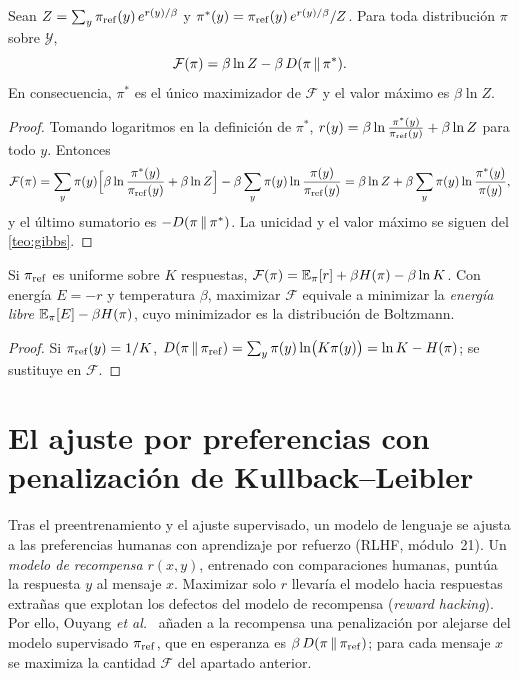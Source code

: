 \begin{teorema}\label{teo:variacional}
Sean $Z=\sum_y\pi_{\mathrm{ref}}(y)\,e^{r(y)/\beta}$ y $\pi^{*}(y)=\pi_{\mathrm{ref}}(y)\,e^{r(y)/\beta}/Z$. Para toda distribución $\pi$ sobre $\mathcal{Y}$,
\[
\mathcal{F}(\pi)=\beta\ln Z-\beta\,D(\pi\,\|\,\pi^{*}).
\]
En consecuencia, $\pi^{*}$ es el único maximizador de $\mathcal{F}$ y el valor máximo es $\beta\ln Z$.
\end{teorema}

\begin{proof}
Tomando logaritmos en la definición de $\pi^{*}$, $r(y)=\beta\ln\frac{\pi^{*}(y)}{\pi_{\mathrm{ref}}(y)}+\beta\ln Z$ para todo $y$. Entonces
\[
\mathcal{F}(\pi)=\sum_y\pi(y)\Bigl[\beta\ln\frac{\pi^{*}(y)}{\pi_{\mathrm{ref}}(y)}+\beta\ln Z\Bigr]-\beta\sum_y\pi(y)\ln\frac{\pi(y)}{\pi_{\mathrm{ref}}(y)}
=\beta\ln Z+\beta\sum_y\pi(y)\ln\frac{\pi^{*}(y)}{\pi(y)},
\]
y el último sumatorio es $-D(\pi\,\|\,\pi^{*})$. La unicidad y el valor máximo se siguen del \cref{teo:gibbs}.
\end{proof}

\begin{corolario}\label{cor:energia-libre}
Si $\pi_{\mathrm{ref}}$ es uniforme sobre $K$ respuestas, $\mathcal{F}(\pi)=\mathbb{E}_\pi[r]+\beta H(\pi)-\beta\ln K$. Con energía $E=-r$ y temperatura $\beta$, maximizar $\mathcal{F}$ equivale a minimizar la \emph{energía libre} $\mathbb{E}_\pi[E]-\beta H(\pi)$, cuyo minimizador es la distribución de Boltzmann.
\end{corolario}

\begin{proof}
Si $\pi_{\mathrm{ref}}(y)=1/K$, $D(\pi\,\|\,\pi_{\mathrm{ref}})=\sum_y\pi(y)\ln\bigl(K\pi(y)\bigr)=\ln K-H(\pi)$; se sustituye en $\mathcal{F}$.
\end{proof}

\section{El ajuste por preferencias con penalización de Kullback--Leibler}

Tras el preentrenamiento y el ajuste supervisado, un modelo de lenguaje se ajusta a las preferencias humanas con aprendizaje por refuerzo (RLHF, módulo~21). Un \emph{modelo de recompensa} $r(x,y)$, entrenado con comparaciones humanas, puntúa la respuesta $y$ al mensaje $x$. Maximizar solo $r$ llevaría el modelo hacia respuestas extrañas que explotan los defectos del modelo de recompensa (\emph{reward hacking}). Por ello, Ouyang \emph{et al.}~\cite{instructgpt} añaden a la recompensa una penalización por alejarse del modelo supervisado $\pi_{\mathrm{ref}}$, que en esperanza es $\beta\,D(\pi\,\|\,\pi_{\mathrm{ref}})$; para cada mensaje $x$ se maximiza la cantidad $\mathcal{F}$ del apartado anterior.

